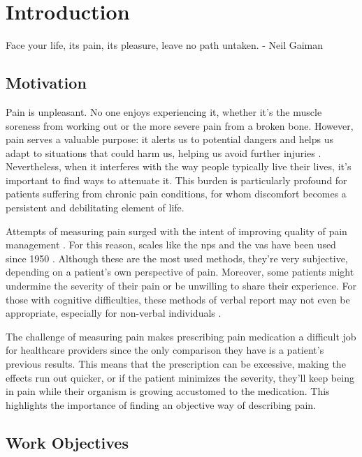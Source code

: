 \chapter{Introduction}%
\label{chapter:introduction}

\begin{introduction}
Face your life, its pain, its pleasure, leave no path untaken. - Neil Gaiman
\end{introduction}


\section{Motivation}
Pain is unpleasant. No one enjoys experiencing it, whether it's the muscle soreness from working out or the more severe pain from a broken bone. However, pain serves a valuable purpose: it alerts us to potential dangers and helps us adapt to situations that could harm us, helping us avoid further injuries \cite{Coninx2021}. Nevertheless, when it interferes with the way people typically live their lives, it's important to find ways to attenuate it. This burden is particularly profound for patients suffering from chronic pain conditions, for whom discomfort becomes a persistent and debilitating element of life.

Attempts of measuring pain surged with the intent of improving quality of pain management \cite{Nugent2021}. For this reason, scales like the \ac{nps} and the \ac{vas} have been used since 1950 \cite{Bielewicz2022}. Although these are the most used methods, they're very subjective, depending on a patient's own perspective of pain. Moreover, some patients might undermine the severity of their pain or be unwilling to share their experience. For those with cognitive difficulties, these methods of verbal report may not even be appropriate, especially for non-verbal individuals \cite{Qin2022}.

The challenge of measuring pain makes prescribing pain medication a difficult job for healthcare providers since the only comparison they have is a patient's previous results. This means that the prescription can be excessive, making the effects run out quicker, or if the patient minimizes the severity, they'll keep being in pain while their organism is growing accustomed to the medication.
This highlights the importance of finding an objective way of describing pain.




\section{Work Objectives}









